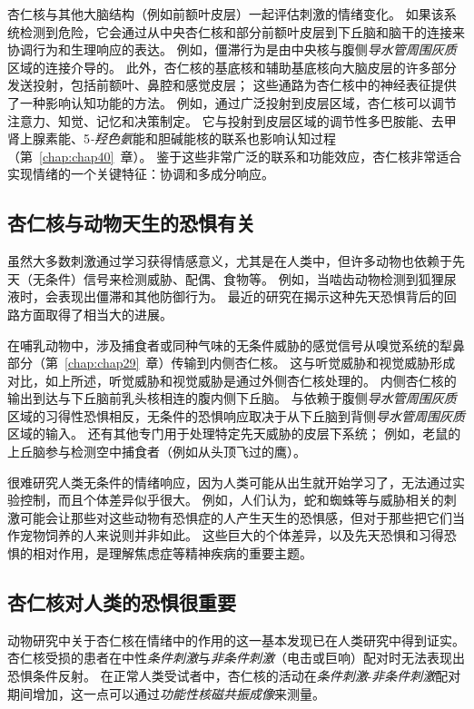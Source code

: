 杏仁核与其他大脑结构（例如前额叶皮层）一起评估刺激的情绪变化。
如果该系统检测到危险，它会通过从中央杏仁核和部分前额叶皮层到下丘脑和脑干的连接来协调行为和生理响应的表达。
例如，僵滞行为是由中央核与腹侧\textit{导水管周围灰质}区域的连接介导的。
此外，杏仁核的基底核和辅助基底核向大脑皮层的许多部分发送投射，包括前额叶、鼻腔和感觉皮层；
这些通路为杏仁核中的神经表征提供了一种影响认知功能的方法。
例如，通过广泛投射到皮层区域，杏仁核可以调节注意力、知觉、记忆和决策制定。
它与投射到皮层区域的调节性多巴胺能、去甲肾上腺素能、5\textit{-羟色氨}能和胆碱能核的联系也影响认知过程（第~\ref{chap:chap40}~章）。
鉴于这些非常广泛的联系和功能效应，杏仁核非常适合实现情绪的一个关键特征：协调和多成分响应。



\subsection{杏仁核与动物天生的恐惧有关}

虽然大多数刺激通过学习获得情感意义，尤其是在人类中，但许多动物也依赖于先天（无条件）信号来检测威胁、配偶、食物等。
例如，当啮齿动物检测到狐狸尿液时，会表现出僵滞和其他防御行为。
最近的研究在揭示这种先天恐惧背后的回路方面取得了相当大的进展。


在哺乳动物中，涉及捕食者或同种气味的无条件威胁的感觉信号从嗅觉系统的犁鼻部分（第~\ref{chap:chap29}~章）传输到内侧杏仁核。
这与听觉威胁和视觉威胁形成对比，如上所述，听觉威胁和视觉威胁是通过外侧杏仁核处理的。
内侧杏仁核的输出到达与下丘脑前乳头核相连的腹内侧下丘脑。
与依赖于腹侧\textit{导水管周围灰质}区域的习得性恐惧相反，无条件的恐惧响应取决于从下丘脑到背侧\textit{导水管周围灰质}区域的输入。
还有其他专门用于处理特定先天威胁的皮层下系统；
例如，老鼠的上丘脑参与检测空中捕食者（例如从头顶飞过的鹰）。


很难研究人类无条件的情绪响应，因为人类可能从出生就开始学习了，无法通过实验控制，而且个体差异似乎很大。
例如，人们认为，蛇和蜘蛛等与威胁相关的刺激可能会让那些对这些动物有恐惧症的人产生天生的恐惧感，但对于那些把它们当作宠物饲养的人来说则并非如此。
这些巨大的个体差异，以及先天恐惧和习得恐惧的相对作用，是理解焦虑症等精神疾病的重要主题。



\subsection{杏仁核对人类的恐惧很重要}

动物研究中关于杏仁核在情绪中的作用的这一基本发现已在人类研究中得到证实。
杏仁核受损的患者在中性\textit{条件刺激}与\textit{非条件刺激}（电击或巨响）配对时无法表现出恐惧条件反射。
在正常人类受试者中，杏仁核的活动在\textit{条件刺激}-\textit{非条件刺激}配对期间增加，这一点可以通过\textit{功能性核磁共振成像}来测量。


